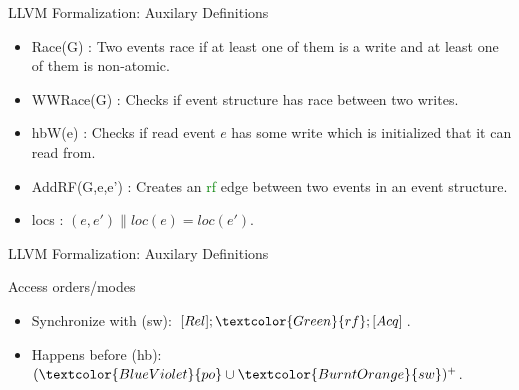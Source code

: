 \documentclass[xcolor=dvipsnames, notes]{beamer}
\newcommand{\po}{\textcolor{BlueViolet}{po}}
\newcommand{\rf}{\textcolor{Green}{rf}}
\newcommand{\hb}{\textcolor{NavyBlue}{hb}}
\newcommand{\sw}{\textcolor{BurntOrange}{sw}}
\begin{document}
    \begin{frame}{LLVM Formalization: Auxilary Definitions}
    
        \begin{itemize}
            \item Race(G) : Two events race if at least one of them is a write and at least one of them is non-atomic.
            \item WWRace(G) : Checks if event structure has race between two writes.
            \item hbW(e) : Checks if read event $e$ has some write which is initialized that it can read from. 
            \item AddRF(G,e,e') : Creates an {\rf} edge between two events in an event structure.
            \item locs : $(e,e') \| loc(e) = loc(e')$.
        \end{itemize}
        

    \end{frame}

    \begin{frame}{LLVM Formalization: Auxilary Definitions}
        
        Access orders/modes
        \begin{figure}
        \end{figure}

        \begin{itemize}
            \item Synchronize with ({\sw}): $[Rel];\rf;[Acq]$. 
            \item Happens before ({\hb}): $(\po \cup \sw)^{+}$.
        \end{itemize}

    \end{frame}
\end{document}

